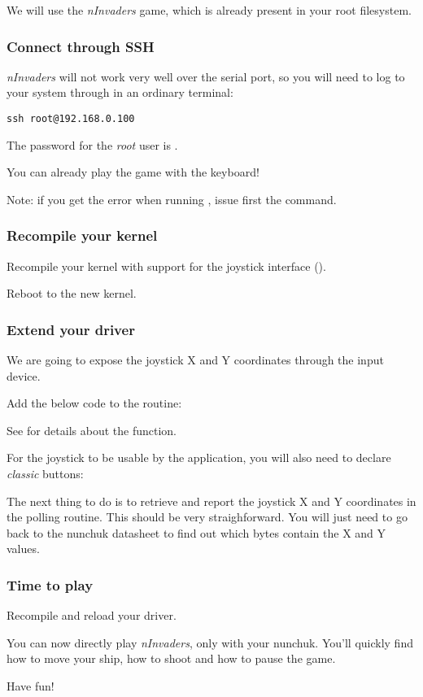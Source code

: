 We will use the {\em nInvaders} game, which is already present in
your root filesystem.

\subsubsection{Connect through SSH}

{\em nInvaders} will not work very well over the serial port,
so you will need to log to your system through  in an
ordinary terminal:

\begin{verbatim}
ssh root@192.168.0.100
\end{verbatim}

The password for the {\em root} user is .

You can already play the  game with
the keyboard!

Note: if you get the error 
when running , issue first the
 command.

\subsubsection{Recompile your kernel}

Recompile your kernel with support for the joystick interface
().

Reboot to the new kernel.

\subsubsection{Extend your driver}

We are going to expose the joystick X and Y coordinates through
the input device.

Add the below code to the  routine:

See  for details about
the  function.

For the joystick to be usable by the application, you will also
need to declare {\em classic} buttons:


The next thing to do is to retrieve and report the joystick X and Y
coordinates in the polling routine. This should be very straighforward.
You will just need to go back to the nunchuk datasheet to find out
which bytes contain the X and Y values.

\subsubsection{Time to play}

Recompile and reload your driver.

You can now directly play {\em nInvaders}, only with your nunchuk.
You'll quickly find how to move your ship, how to shoot and how
to pause the game.

Have fun!
